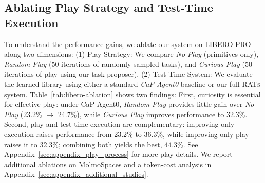 \subsection{Ablating Play Strategy and Test-Time Execution}
\label{subsec:ablation}
To understand the performance gains, we ablate our system on LIBERO-PRO along two dimensions:
(1) Play Strategy: We compare \emph{No Play} (primitives only), \emph{Random Play} (50 iterations of randomly sampled tasks), and \emph{Curious Play} (50 iterations of play using our task proposer).
(2) Test-Time System: We evaluate the learned library using either a standard \emph{CaP-Agent0} baseline or our full \textsc{RATs} system.
Table~\ref{tab:libero-ablation} shows two findings:
First, curiosity is essential for effective play: under CaP-Agent0, \emph{Random Play} provides little gain over \emph{No Play} (23.2\% $\to$ 24.7\%), while \emph{Curious Play} improves performance to 32.3\%.
Second, play and test-time execution are complementary: improving only execution raises performance from 23.2\% to 36.3\%, while improving only play raises it to 32.3\%; combining both yields the best, 44.3\%. See Appendix~\ref{sec:appendix_play_process} for more play details. We report additional ablations on MolmoSpaces and a token-cost analysis in Appendix~\ref{sec:appendix_additional_studies}.



